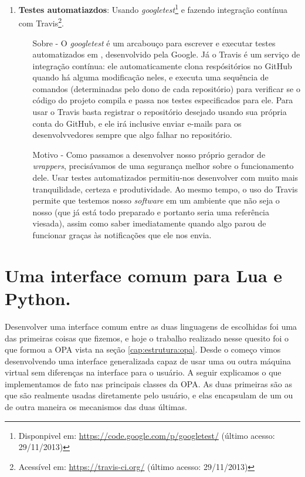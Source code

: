 \begin{enumerate}
    \item \textbf{Testes automatiazdos}: Usando \textit{googletest}\footnote{Disponpivel
      em: \url{https://code.google.com/p/googletest/} (último acesso: 29/11/2013)} e
      fazendo integração contínua com Travis\footnote{Acessível em:
      \url{https://travis-ci.org/} (último acesso: 29/11/2013)}.
      \begin{itemize}
        \item[Sobre -] O \textit{googletest} é um arcabouço para escrever e
          executar testes automatizados em \CXX{}, desenvolvido pela Google.
          Já o Travis é um serviço de integração contínua: ele
          automaticamente clona respósitórios no GitHub quando há alguma
          modificação neles, e executa uma sequência de comandos (determinadas
          pelo dono de cada repositório) para verificar se o código do projeto
          compila e passa nos testes especificados para ele. Para usar o
          Travis basta registrar o repositório desejado usando sua própria conta
          do GitHub, e ele irá inclusive enviar e-mails para os desenvolvvedores
          sempre que algo falhar no repositório.
        \item[Motivo -] Como passamos a desenvolver nosso próprio gerador de
          \textit{wrappers}, precisávamos de uma segurança melhor sobre o
          funcionamento dele. Usar testes automatizados permitiu-nos desenvolver
          com muito mais tranquilidade, certeza e produtividade. Ao mesmo tempo,
          o uso do Travis permite que testemos nosso \textit{software} em
          um ambiente que não seja o nosso (que já está todo preparado e portanto
          seria uma referência viesada), assim como saber imediatamente quando
          algo parou de funcionar graças às notificações que ele nos envia.
      \end{itemize}
  \end{enumerate}
  
  \section{Uma interface comum para Lua e Python.}
  \label{sec:atividades:opa}
  Desenvolver uma interface comum entre as duas linguagens de \script{} escolhidas
  foi uma das primeiras coisas que fizemos, e hoje o trabalho realizado nesse
  quesito foi o que formou a OPA vista na seção \ref{cap:estrutura:opa}. Desde o
  começo vimos desenvolvendo uma interface generalizada capaz de usar uma ou outra
  máquina virtual sem diferenças na interface para o usuário. A seguir explicamos
  o que implementamos de fato nas principais classes da OPA. As duas primeiras são
  as que são realmente usadas diretamente pelo usuário, e elas encapsulam de um ou
  de outra maneira os mecanismos das duas últimas.
  
